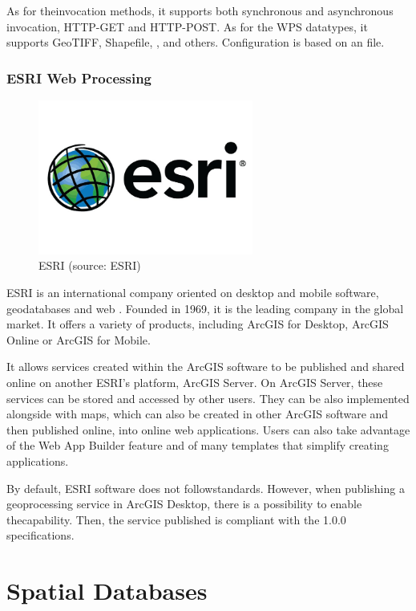As for theinvocation methods, it supports both synchronous and
asynchronous invocation, HTTP-GET and HTTP-POST. As for the WPS
datatypes, it supports GeoTIFF, Shapefile, ,  and
others. \cite{north} Configuration is based on an  file.
  

\subsubsection{ESRI Web Processing}

\begin{figure}[H] \centering
      \includegraphics[width=200pt]{./pictures/esri.png}
      \caption[ESRI logo]{ESRI (source: ESRI)}
      \label{fig:ESRI}
  \end{figure}

ESRI is an international company oriented on desktop and mobile 
software, geodatabases and web . Founded in 1969, it is the leading
company in the global  market. It offers a variety of  products,
including ArcGIS for Desktop, ArcGIS Online or ArcGIS for Mobile.

It allows services created within the ArcGIS software to be published
and shared online on another ESRI's platform, ArcGIS Server. \cite{esripublish} On ArcGIS
Server, these services can be stored and accessed by other users. They
can be also implemented alongside with maps, which can also be created
in other ArcGIS software and then published online, into online web
applications. Users can also take advantage of the Web App Builder
feature and of many templates that simplify creating applications.

By default, ESRI software does not followstandards. However, when
publishing a geoprocessing service in ArcGIS Desktop, there is a
possibility to enable thecapability. Then, the service published
is compliant with the   1.0.0 specifications.\cite{arcgiswps}

\section{Spatial Databases}

